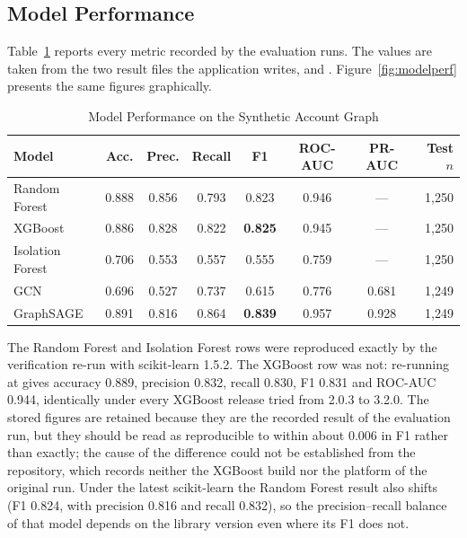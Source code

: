 \subsection{Model Performance}
Table~\ref{tab:results} reports every metric recorded by the evaluation runs. The values are taken from the two result files the application writes,  and . Figure~\ref{fig:modelperf} presents the same figures graphically.

\begin{table}[htbp]
\centering
\caption{Model Performance on the Synthetic Account Graph}
\label{tab:results}
\small
\begin{tabular}{@{}lccccccr@{}}
\toprule
\textbf{Model} & \textbf{Acc.} & \textbf{Prec.} & \textbf{Recall} & \textbf{F1} & \textbf{ROC-AUC} & \textbf{PR-AUC} & \textbf{Test $n$} \\
\midrule
Random Forest    & 0.888 & 0.856 & 0.793 & 0.823 & 0.946 & ---   & 1,250 \\
XGBoost          & 0.886 & 0.828 & 0.822 & \textbf{0.825} & 0.945 & --- & 1,250 \\
Isolation Forest & 0.706 & 0.553 & 0.557 & 0.555 & 0.759 & ---   & 1,250 \\
GCN              & 0.696 & 0.527 & 0.737 & 0.615 & 0.776 & 0.681 & 1,249 \\
GraphSAGE        & 0.891 & 0.816 & 0.864 & \textbf{0.839} & 0.957 & 0.928 & 1,249 \\
\bottomrule
\end{tabular}
\end{table}

The Random Forest and Isolation Forest rows were reproduced exactly by the verification re-run with scikit-learn 1.5.2. The XGBoost row was not: re-running at  gives accuracy 0.889, precision 0.832, recall 0.830, F1 0.831 and ROC-AUC 0.944, identically under every XGBoost release tried from 2.0.3 to 3.2.0. The stored figures are retained because they are the recorded result of the evaluation run, but they should be read as reproducible to within about 0.006 in F1 rather than exactly; the cause of the difference could not be established from the repository, which records neither the XGBoost build nor the platform of the original run. Under the latest scikit-learn the Random Forest result also shifts (F1 0.824, with precision 0.816 and recall 0.832), so the precision--recall balance of that model depends on the library version even where its F1 does not.

